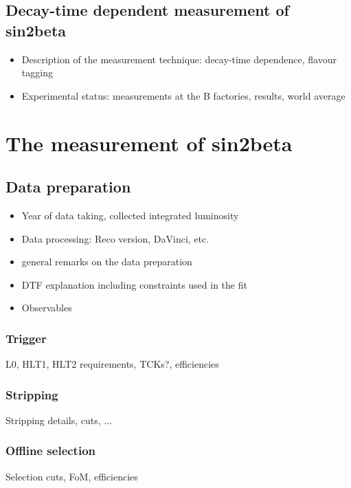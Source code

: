 \section{Decay-time dependent measurement of sin2beta}
\begin{itemize}
  \item Description of the measurement technique: decay-time dependence, flavour tagging
  \item Experimental status: measurements at the B factories, results, world average
\end{itemize}



\chapter{The measurement of sin2beta}
\section{Data preparation}
\begin{itemize}
  \item Year of data taking, collected integrated luminosity
  \item Data processing: Reco version, DaVinci, etc.
  \item general remarks on the data preparation
  \item DTF explanation including constraints used in the fit
  \item Observables
\end{itemize}

\subsection{Trigger}
L0, HLT1, HLT2 requirements, TCKs?, efficiencies

\subsection{Stripping}
Stripping details, cuts, ...

\subsection{Offline selection}
Selection cuts, FoM, efficiencies

